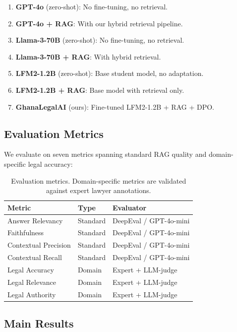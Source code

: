 \documentclass[11pt]{article}
\begin{document}
\begin{enumerate}
    \item \textbf{GPT-4o} (zero-shot): No fine-tuning, no retrieval.
    \item \textbf{GPT-4o + RAG}: With our hybrid retrieval pipeline.
    \item \textbf{Llama-3-70B} (zero-shot): No fine-tuning, no retrieval.
    \item \textbf{Llama-3-70B + RAG}: With hybrid retrieval.
    \item \textbf{LFM2-1.2B} (zero-shot): Base student model, no adaptation.
    \item \textbf{LFM2-1.2B + RAG}: Base model with retrieval only.
    \item \textbf{GhanaLegalAI} (ours): Fine-tuned LFM2-1.2B + RAG + DPO.
\end{enumerate}


\subsection{Evaluation Metrics}

We evaluate on seven metrics spanning standard RAG quality and
domain-specific legal accuracy:

\begin{table}[t]
\centering
\small
\begin{tabular}{lll}
\toprule
\textbf{Metric} & \textbf{Type} & \textbf{Evaluator} \\
\midrule
Answer Relevancy & Standard & DeepEval / GPT-4o-mini \\
Faithfulness & Standard & DeepEval / GPT-4o-mini \\
Contextual Precision & Standard & DeepEval / GPT-4o-mini \\
Contextual Recall & Standard & DeepEval / GPT-4o-mini \\
\midrule
Legal Accuracy & Domain & Expert + LLM-judge \\
Legal Relevance & Domain & Expert + LLM-judge \\
Legal Authority & Domain & Expert + LLM-judge \\
\bottomrule
\end{tabular}
\caption{Evaluation metrics. Domain-specific metrics are validated
against expert lawyer annotations.}
\label{tab:metrics}
\end{table}


\subsection{Main Results}
\end{document}
